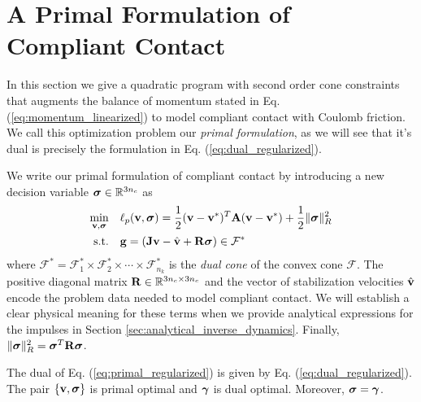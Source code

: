 
\section{A Primal Formulation of Compliant Contact}
In this section we give a quadratic program with second order cone constraints
that augments the balance of momentum stated in Eq.
(\ref{eq:momentum_linearized}) to model compliant contact with Coulomb friction.
We call this optimization problem our \emph{primal formulation}, as we will see
that it's dual is precisely the formulation in Eq. (\ref{eq:dual_regularized}).

We write our primal formulation of compliant contact by introducing a new
decision variable ${\bm{\sigma}}\in\mathbb{R}^{3n_c}$ as
\begin{equation}
	\begin{aligned}
	\min_{\mf{v},\bsigma} \quad & \ell_p(\mf{v},\bsigma) = \frac{1}{2}(\mf{v}-\mf{v}^*)^T\mf{A}(\mf{v}-\mf{v}^*) + \frac{1}{2} \Vert\bsigma\Vert_{R}^2\\
	\textrm{s.t.} \quad & \mf{g} = (\mf{J}\mf{v}-\hat{\mf{v}} + \mf{R}\bsigma) \in \mathcal{F}^*\\
	\end{aligned}
	\label{eq:primal_regularized}
\end{equation}
where $\mathcal{F^*}= \mathcal{F}^*_1 \times \mathcal{F}^*_2 \times \cdots \times \mathcal{F}^*_{n_k}$ is the \emph{dual cone} of the convex
cone $\mathcal{F}$. The positive diagonal matrix ${\mathbf{R}}\in\mathbb{R}^{3n_c\times
3n_c}$ and the vector of stabilization velocities $\hat{{\mathbf{v}}}$ encode the
problem data needed to model compliant contact. We will establish a clear
physical meaning for these terms when we provide analytical expressions for the
impulses in Section \ref{sec:analytical_inverse_dynamics}. Finally,
$\Vert{\bm\sigma}\Vert_R^2={\bm\sigma}^T{\mathbf{R}}{\bm\sigma}$.

\begin{theorem}
The dual of Eq. (\ref{eq:primal_regularized}) is given by Eq.
(\ref{eq:dual_regularized}). The pair $\{{\mathbf{v}},{\bm\sigma}\}$ is primal optimal and
${\bm\gamma}$ is dual optimal. Moreover, ${\bm\sigma} = {\bm\gamma}$.
\end{theorem}

